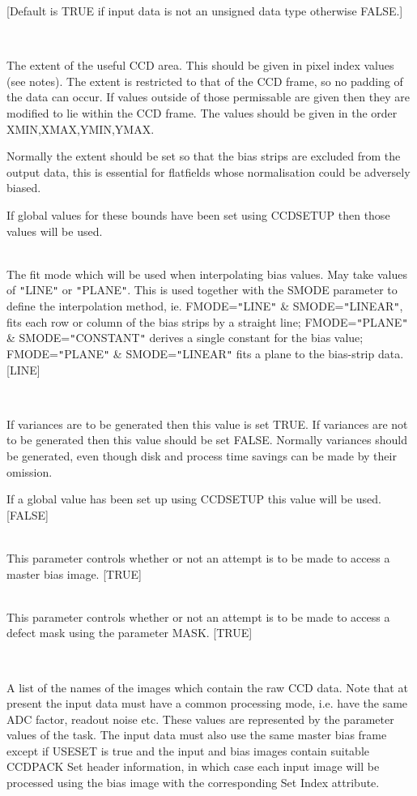 \documentclass[twoside,11pt]{article}
\newcommand{\htmlref}[2]{#1}
\renewcommand{\_}{\texttt{\symbol{95}}}
\newcommand{\qt}[1]{{\tt "}#1{\tt "}}
\newcommand{\xroutine}[1]{\htmlref{{\sc #1}}{#1}}
\newcommand{\sstsubsection}[1]{ \item[{#1}] \mbox{} \\}
\newcommand{\sstsubsection}[1]{\item[{#1}]}
\begin{document}
{{{         [Default is TRUE if input data is not an unsigned data type
         otherwise FALSE.]
      }
      \sstsubsection{
         EXTENT(4) = \_INTEGER (Read)
      } {
         The extent of the useful CCD area. This should be given in
         pixel index values (see notes). The extent is restricted to
         that of the CCD frame, so no padding of the data can occur. If
         values outside of those permissable are given then they are
         modified to lie within the CCD frame. The values should be
         given in the order XMIN,XMAX,YMIN,YMAX.

         Normally the extent should be set so that the bias strips
         are excluded from the output data, this is essential for
         flatfields whose normalisation could be adversely biased.

         If global values for these bounds have been set using
         \xroutine{CCDSETUP} then those values will be used.
      }
      \sstsubsection{
         FMODE = LITERAL (Read)
      } {
         The fit mode which will be used when interpolating bias values.
         May take values of \qt{LINE} or \qt{PLANE}. This is used together
         with the SMODE parameter to define the interpolation method,
         ie. FMODE=\qt{LINE} \& SMODE=\qt{LINEAR}, fits each row or column of
         the bias strips by a straight line; FMODE=\qt{PLANE} \&
         SMODE=\qt{CONSTANT} derives a single constant for the bias value; \\
         FMODE=\qt{PLANE} \& SMODE=\qt{LINEAR} fits a plane to the bias-strip
         data.
         [LINE]
      }
      \sstsubsection{
         GENVAR = \_LOGICAL (Read)
      } {
         If variances are to be generated then this value is set
         TRUE. If variances are not to be generated then this value
         should be set FALSE. Normally variances should be generated,
         even though disk and process time savings can be made by their
         omission.

         If a global value has been set up using \xroutine{CCDSETUP} this value
         will be used.
         [FALSE]
      }
      \sstsubsection{
         GETBIAS = \_LOGICAL (Read)
      } {
         This parameter controls whether or not an attempt is to be made
         to access a master bias image.
         [TRUE]
      }
      \sstsubsection{
         GETMASK = \_LOGICAL (Read)
      } {
         This parameter controls whether or not an attempt is to be made
         to access a defect mask using the parameter MASK.
         [TRUE]
      }
      \sstsubsection{
         IN = LITERAL (Read)
      } {
         A list of the names of the images which contain the raw CCD
         data. Note that at present the input data must have a common
         processing mode, i.e. have the same ADC factor, readout noise
         etc. These values are represented by the parameter values of 
         the task.  The input data must also use the same master bias
         frame except if USESET is true and the input and bias images
         contain suitable CCDPACK Set header information, in which
         case each input image will be processed using the bias image
         with the corresponding Set Index attribute.

}}}
\end{document}
